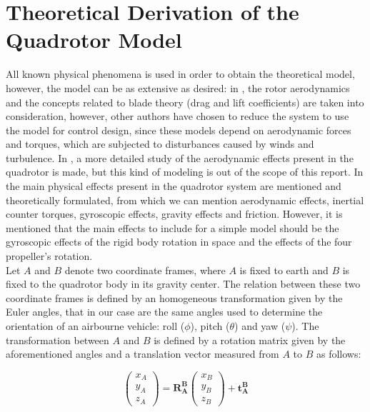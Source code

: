 \section{Theoretical Derivation of the Quadrotor Model}

All known physical phenomena is used in order to obtain the theoretical model, however, the model can be as extensive as desired: in \cite{MahoneyKumarCorke2012}, the rotor aerodynamics and the concepts related to blade theory (drag and lift coefficients) are taken into consideration, however, other authors have chosen to reduce the system to use the model for control design, since these models depend on aerodynamic forces and torques, which are subjected to disturbances caused by winds and turbulence. In \cite{Hoffmann2007}, a more detailed study of the aerodynamic effects present in the quadrotor is made, but this kind of modeling is out of the scope of this report. In \cite{Bouabdallah2004} the main physical effects present in the quadrotor system are mentioned and theoretically formulated, from which we can mention aerodynamic effects, inertial counter torques, gyroscopic effects, gravity effects and friction. However, it is mentioned that the main effects to include for a simple model should be the gyroscopic effects of the rigid body rotation in space and the effects of the four propeller's rotation. \\

Let {$A$} and {$B$} denote two coordinate frames, where {$A$} is fixed to earth and {$B$} is fixed to the quadrotor body in its gravity center. The relation between these two coordinate frames is defined by an homogeneous transformation given by the Euler angles, that in our case are the same angles used to determine the orientation of an airbourne vehicle: roll ($\phi$), pitch ($\theta$) and yaw ($\psi$). The transformation between {$A$} and {$B$} is defined by a rotation matrix given by the aforementioned angles and a translation vector measured from {$A$} to {$B$} as follows: 

\begin{equation} \label{eq:transformation}
\begin{pmatrix} x_A \\
				y_A \\
				z_A \end{pmatrix} = \mathbf{R_{A}^{B}}\begin{pmatrix} x_B \\
															  y_B \\
															  z_B \end{pmatrix} + \mathbf{t_{A}^{B}} 
\end{equation}

